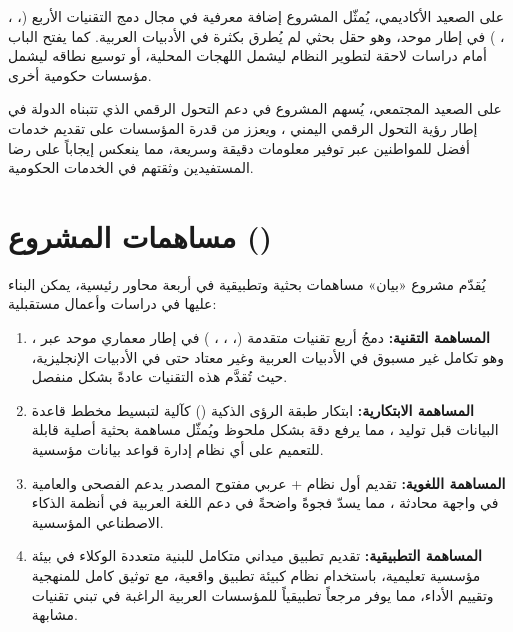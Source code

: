 على الصعيد الأكاديمي، يُمثّل المشروع إضافة معرفية في مجال دمج التقنيات الأربع
(، ، ، ) في إطار موحد، وهو
حقل بحثي لم يُطرق بكثرة في الأدبيات العربية. كما يفتح الباب أمام دراسات لاحقة
لتطوير النظام ليشمل اللهجات المحلية، أو توسيع نطاقه ليشمل مؤسسات حكومية أخرى.

على الصعيد المجتمعي، يُسهم المشروع في دعم التحول الرقمي الذي تتبناه الدولة
في إطار رؤية التحول الرقمي اليمني \cite{un2024egd}، ويعزز من قدرة المؤسسات على تقديم خدمات
أفضل للمواطنين عبر توفير معلومات دقيقة وسريعة، مما ينعكس إيجاباً على رضا
المستفيدين وثقتهم في الخدمات الحكومية.

\section{مساهمات المشروع ()}
\label{sec:contributions}

يُقدّم مشروع «بيان» مساهمات بحثية وتطبيقية في أربعة محاور رئيسية، يمكن
البناء عليها في دراسات وأعمال مستقبلية:

\begin{enumerate}
  \item \textbf{المساهمة التقنية:} دمجُ أربع تقنيات متقدمة (،
        ، ، ) في إطار معماري موحد عبر
        ، وهو تكامل غير مسبوق في الأدبيات العربية وغير معتاد حتى
        في الأدبيات الإنجليزية، حيث تُقدَّم هذه التقنيات عادةً بشكل منفصل.
  \item \textbf{المساهمة الابتكارية:} ابتكار طبقة الرؤى الذكية () كآلية
        لتبسيط مخطط قاعدة البيانات قبل توليد ، مما يرفع دقة
         بشكل ملحوظ ويُمثّل مساهمة بحثية أصلية قابلة للتعميم على
        أي نظام إدارة قواعد بيانات مؤسسية.
  \item \textbf{المساهمة اللغوية:} تقديم أول نظام + عربي
        مفتوح المصدر يدعم الفصحى والعامية في واجهة محادثة ، مما يسدّ
        فجوةً واضحةً في دعم اللغة العربية في أنظمة الذكاء الاصطناعي المؤسسية.
  \item \textbf{المساهمة التطبيقية:} تقديم تطبيق ميداني متكامل للبنية متعددة
        الوكلاء في بيئة مؤسسية تعليمية، باستخدام نظام 
        كبيئة تطبيق واقعية، مع توثيق كامل للمنهجية وتقييم الأداء، مما يوفر
        مرجعاً تطبيقياً للمؤسسات العربية الراغبة في تبني تقنيات مشابهة.
\end{enumerate}

